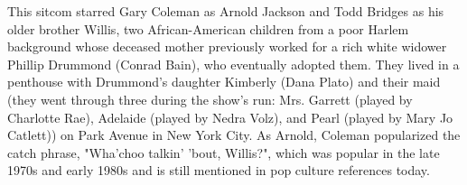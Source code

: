 This sitcom starred Gary Coleman as Arnold Jackson and Todd Bridges as his older brother Willis, two African-American children from a poor Harlem background whose deceased mother previously worked for a rich white widower Phillip Drummond (Conrad Bain), who eventually adopted them. They lived in a penthouse with Drummond's daughter Kimberly (Dana Plato) and their maid (they went through three during the show's run: Mrs. Garrett (played by Charlotte Rae), Adelaide (played by Nedra Volz), and Pearl (played by Mary Jo Catlett)) on Park Avenue in New York City. As Arnold, Coleman popularized the catch phrase, "Wha'choo talkin' 'bout, Willis?", which was popular in the late 1970s and early 1980s and is still mentioned in pop culture references today.

